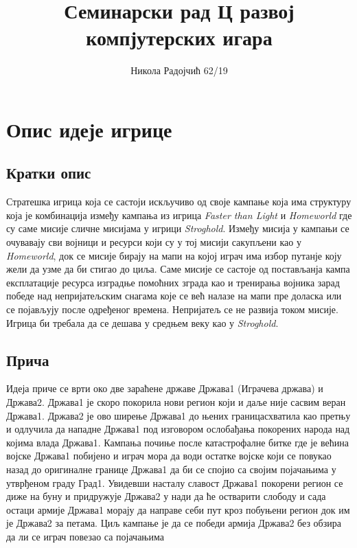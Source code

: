\documentclass[11pt,a4paper]{report}
\title{Семинарски рад Ц развој компјутерских игара}
\author{Никола Радојчић 62/19}
\begin{document}
\maketitle
\newpage

\tableofcontents
\newpage

\chapter{Опис идеје игрице}

\section{Кратки опис}
Стратешка игрица која се састоји искључиво од своје кампање која има структуру која је комбинација између кампања из игрица \emph{Faster than Light} и \emph{Homeworld} где су саме мисије сличне мисијама у игрици \emph{Stroghold}. Између мисија у кампањи се очувавају сви војници и ресурси који су у тој мисији сакупљени као у \emph{Homeworld}, док се мисије бирају на мапи на којој играч има избор путанје коју жели да узме да би стигао до циља. Саме мисије се састоје од постављанја кампа експлатације ресурса изградње помоћних зграда као и тренирања војника зарад победе над непријатељским снагама које се већ налазе на мапи пре доласка или се појављују после одређеног времена. Непријатељ се не развија током мисије. Игрица би требала да се дешава у средњем веку као у \emph{Stroghold}.

\section{Прича}
Идеја приче се врти око две зараћене државе Држава1 (Играчева држава) и Држава2. Држава1 је скоро покорила нови регион који и даље није сасвим веран Држава1. Држава2 је ово ширење Држава1 до њених границасхватила као претњу и одлучила да нападне Држава1 под изговором ослобађања покорених народа над којима влада Држава1. Кампања почиње после катастрофалне битке где је већина војске Држава1 побијено и играч мора да води остатке војске који се повукао назад до оригиналне границе Држава1 да би се спојио са својим појачањима у утврђеном граду Град1. Увидевши насталу славост Држава1 покорени регион се диже на буну и придружује Држава2 у нади да ће остварити слободу и сада остаци армије Држава1 морају да направе себи пут кроз побуњени регион док им је Држава2 за петама. Циљ кампање је да се победи армија Држава2 без обзира да ли се играч повезао са појачањима
\end{document}
